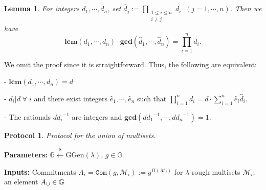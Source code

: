 \documentclass[11pt, lettersize, notitlepage, leqno, footskip=0.6cm]{article}
\newcommand{\pl}{\prod\limits}
\newcommand{\slim}{\sum\limits}
\newcommand{\ttt}{\texttt}
\newcommand{\mc}{\mathcal}
\newcommand{\mb}{\mathbb}
\newcommand{\mbf}{\mathbf}
\newcommand{\mr}{\mathrm}
\newcommand{\lam}{\lambda}
\newcommand{\lamb}{\lambda}
\newcommand{\what}{\widehat}
\newcommand{\vs}{\vspace{-0.15cm}}
\newcommand{\noin}{\noindent}
\newcommand{\LCM}{\mbf{lcm}}
\newcommand{\GCD}{\mbf{gcd}}
\newtheorem{Lem}[Thm]{Lemma}
\newtheorem{Prot}[Thm]{Protocol}
\numberwithin{equation}{section}
\begin{document}
\begin{Lem} For integers $d_1,\cdots,d_n$, set $\what{d}_j:= \pl_{\substack{1\leq i\leq n \\ i\neq j}} d_i \;\;(j=1,\cdots,n)$. Then we have \vspace{-0.3cm} $$ \LCM(d_1,\cdots,d_n)\cdot \GCD(\what{d}_1,\cdots,\what{d}_n) = \pl_{i=1}^n d_i.$$ \end{Lem}

\noin We omit the proof since it is straightforward. Thus, the following are equivalent:\vspace{0.1cm}

\noin - $\LCM(d_1,\cdots,d_n) = d$

\noin - $d_i\big| d\;\forall\; i$ and there exist integers $\what{e}_1,\cdots,\what{e}_n$ such that $\pl_{i=1}^n d_i  =  d\cdot\slim_{i=1}^n \what{e}_i\what{d}_i.$

\noin - The rationals ${d}{d_i}^{-1}$ are integers and $\GCD({d}{d_1}^{-1},\cdots,{d}{d_n}^{-1}) = 1 .$

\vspace{0.2cm}

\begin{comment}
Let $p$ be a prime and let $\mr{val}_p(N)$ denote the largest integer $x$ such that $p^x$ divides $N$. Write $k_i:= \mr{val}_p(d_i)$ for brevity. Then $\mr{val}_p(\pl_{i=1}^n d_i) = \slim_{i=1}^n k_i$ and $\mr{val}_p(\what{d}_j) = (\slim_{i=1}^n k_i)-k_i$. Hence, \vs $$\mr{val}_p(\GCD(\what{d}_1,\cdots,\what{d}_n)) = \min\big((\slim_{i=1}^n k_i)-k_i\big)_i = \slim_{i=1}^n k_i - \max(k_1,\cdots,k_n).$$ On the other hand, \vs $$\mr{val}_p(\LCM(d_1,\cdots,d_n)) = \max(k_1,\cdots,k_n).$$ Thus, \vs $$\mr{val}_p(\LCM(d_1,\cdots,d_n))+ \mr{val}_p(\GCD(\what{d}_1,\cdots,\what{d}_n)) = \mr{val}_p(\pl_{i=1}^n d_i),$$ which completes the proof. \end{comment}





\begin{Prot} Protocol for the union of multisets.\end{Prot} \vspace{-0.3cm}

\noin \textbf{Parameters:} $\mb{G}\xleftarrow{\$} \mr{GGen}(\lamb)$,\; $g\in \mb{G}$.

\noin \textbf{Inputs:} Commitments $A_i = \ttt{Com}(g, \mc{M}_i) := g^{\Pi(\mc{M}_i)}$ for $\lam$-rough multisets $\mc{M}_i$; an element $A_{\tt{\cup}}\in\mb{G}$\vs
\end{document}
